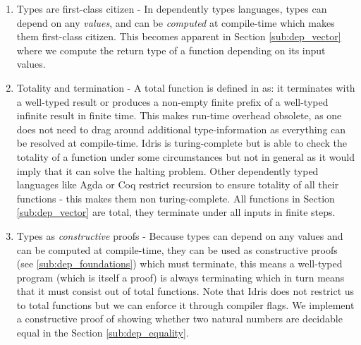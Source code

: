 \begin{enumerate}
	\item Types are first-class citizen - In dependently types languages, types can depend on any \textit{values}, and can be \textit{computed} at compile-time which makes them first-class citizen. This becomes apparent in Section \ref{sub:dep_vector} where we compute the return type of a function depending on its input values.

	\item Totality and termination - A total function is defined in \cite{brady_type-driven_2017} as: it terminates with a well-typed result or produces a non-empty finite prefix of a well-typed infinite result in finite time. This makes run-time overhead obsolete, as one does not need to drag around additional type-information as everything can be resolved at compile-time. Idris is turing-complete but is able to check the totality of a function under some circumstances but not in general as it would imply that it can solve the halting problem. Other dependently typed languages like Agda or Coq restrict recursion to ensure totality of all their functions - this makes them non turing-complete. All functions in Section \ref{sub:dep_vector} are total, they terminate under all inputs in finite steps.

	\item Types as \textit{constructive} proofs - Because types can depend on any values and can be computed at compile-time, they can be used as constructive proofs (see \ref{sub:dep_foundations}) which must terminate, this means a well-typed program (which is itself a proof) is always terminating which in turn means that it must consist out of total functions. Note that Idris does not restrict us to total functions but we can enforce it through compiler flags. We implement a constructive proof of showing whether two natural numbers are decidable equal in the Section \ref{sub:dep_equality}.
\end{enumerate}


